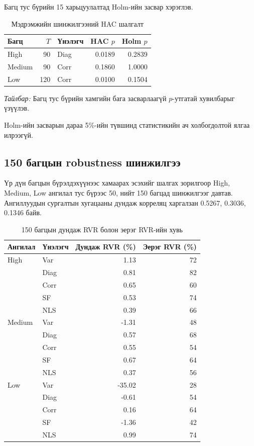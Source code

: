 Багц тус бүрийн 15 харьцуулалтад
Holm-ийн засвар хэрэглэв.

\begin{table}[htbp]
	\centering
	\caption{Мэдрэмжийн шинжилгээний HAC шалгалт}
	\label{tab:nt_hac_summary}
	\small
	\begin{tabular}{lrlrr}
		\hline
		Багц & $T$ & Үнэлэгч & HAC $p$ & Holm $p$\\
		\hline
		High   & 90  & Diag & 0.0189 & 0.2839\\
		Medium & 90  & Corr & 0.1860 & 1.0000\\
		Low    & 120 & Corr & 0.0100 & 0.1504\\
		\hline
	\end{tabular}
\end{table}

\noindent
\textit{Тайлбар:} Багц тус бүрийн хамгийн
бага засварлаагүй $p$-утгатай хувилбарыг
үзүүлэв.

Holm-ийн засварын дараа 5\%-ийн
түвшинд статистикийн ач холбогдолтой
ялгаа илрээгүй.

\subsection{150 багцын robustness шинжилгээ}
\label{subsec:robustness_results}

Үр дүн багцын бүрэлдэхүүнээс хамаарах
эсэхийг шалгах зорилгоор High, Medium,
Low ангилал тус бүрээс 50, нийт 150
багцад шинжилгээг давтав. Ангиллуудын
сургалтын хугацааны дундаж корреляц
харгалзан 0.5267, 0.3036, 0.1346 байв.

\begin{table}[htbp]
	\centering
	\caption{150 багцын дундаж RVR болон эерэг RVR-ийн хувь}
	\label{tab:robustness_rvr}
	\small
	\begin{tabular}{llrr}
		\hline
		Ангилал & Үнэлэгч &
		Дундаж RVR (\%) & Эерэг RVR (\%)\\
		\hline
		High & Var  & 1.13 & 72\\
		& Diag & 0.81 & 82\\
		& Corr & 0.65 & 60\\
		& SF   & 0.53 & 74\\
		& NLS  & 0.39 & 66\\
		\hline
		Medium & Var  & -1.31 & 48\\
		& Diag & 0.57 & 68\\
		& Corr & 0.55 & 54\\
		& SF   & 0.67 & 64\\
		& NLS  & 0.37 & 56\\
		\hline
		Low & Var  & -35.02 & 28\\
		& Diag & -0.61 & 54\\
		& Corr & 0.16 & 64\\
		& SF   & -1.36 & 42\\
		& NLS  & 0.99 & 74\\
		\hline
	\end{tabular}
\end{table}

